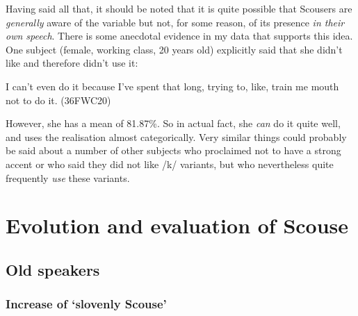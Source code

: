 Having said all that, it should be noted that it is quite possible that Scousers are \emph{generally} aware of the variable but not, for some reason, of its presence \emph{in their own speech}.
There is some anecdotal evidence in my data that supports this idea.
One subject (female, working class, 20 years old) explicitly said that she didn't like  and therefore didn't use it:
\begin{example}
	I can't even do it because I've spent that long, trying to, like, train me mouth not to do it. (36FWC20)
\end{example}
However, she has a mean  of 81.87\%.
So in actual fact, she \emph{can} do it quite well, and uses the  realisation almost categorically.
Very similar things could probably be said about a number of other subjects who proclaimed not to have a strong  accent or who said they did not like  /k/ variants, but who nevertheless quite frequently \emph{use} these variants.

\section{Evolution and evaluation of Scouse}
\label{aware_res.eval}

\subsection{Old speakers}
\label{aware_res.eval.old}

\subsubsection{Increase of `slovenly Scouse'}
\label{aware_res.eval.old.change}


